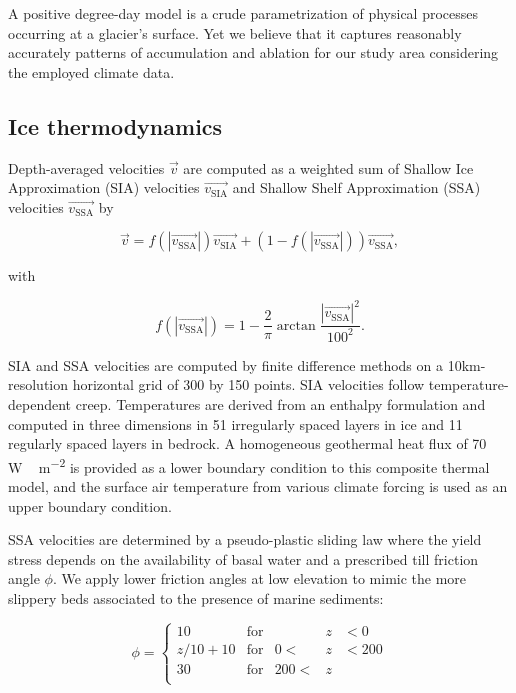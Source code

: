 A positive degree-day model is a crude parametrization of physical processes occurring at a glacier's surface. Yet we believe that it captures reasonably accurately patterns of accumulation and ablation for our study area considering the employed climate data.

\subsection{Ice thermodynamics}

Depth-averaged velocities $\vec{v}$ are computed as a weighted sum of Shallow Ice Approximation (SIA) velocities $\vec{v_{\mathrm{SIA}}}$ and Shallow Shelf Approximation (SSA) velocities $\vec{v_{\mathrm{SSA}}}$ \citep{bueler-brown-2009} by

\begin{equation}
	\vec{v} = f(|\vec{v_{\mathrm{SSA}}}|)\vec{v_{\mathrm{SIA}}}
  + (1-f(|\vec{v_{\mathrm{SSA}}}|))\vec{v_{\mathrm{SSA}}},
\end{equation}

with

\begin{equation}
	f(|\vec{v_{\mathrm{SSA}}}|) = 1
	- \frac{2}{\pi}\arctan{\frac{|\vec{v_{\mathrm{SSA}}}|^2}{100^2}}.
\end{equation}

SIA and SSA velocities are computed by finite difference methods on a 10km-resolution horizontal grid of 300 by 150 points. SIA velocities follow temperature-dependent creep. Temperatures are derived from an enthalpy formulation \citep{aschwanden-etal-2012} and computed in three dimensions in 51 irregularly spaced layers in ice and 11 regularly spaced layers in bedrock. A homogeneous geothermal heat flux of 70\,\unit{W\,m^{-2}} is provided as a lower boundary condition to this composite thermal model, and the surface air temperature from various climate forcing is used as an upper boundary condition.

SSA velocities are determined by a pseudo-plastic sliding law where the yield stress depends on the availability of basal water and a prescribed till friction angle $\phi$. We apply lower friction angles at low elevation to mimic the more slippery beds associated to the presence of marine sediments:

\begin{equation}
	\phi = \left\{\begin{array}{llrll}
		10      & \mathrm{for} &      &z&<  0 \\
		z/10+10 & \mathrm{for} &   0 <&z&<200 \\
		30      & \mathrm{for} & 200 <&z&     \\
	\end{array}\right.
\end{equation}

